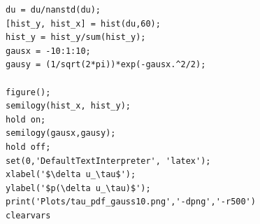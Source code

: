 \documentclass[10pt]{article}
\begin{document}
\begin{lstlisting}
du = du/nanstd(du);
[hist_y, hist_x] = hist(du,60);
hist_y = hist_y/sum(hist_y);
gausx = -10:1:10;
gausy = (1/sqrt(2*pi))*exp(-gausx.^2/2);

figure();
semilogy(hist_x, hist_y);
hold on;
semilogy(gausx,gausy);
hold off;
set(0,'DefaultTextInterpreter', 'latex');
xlabel('$\delta u_\tau$');
ylabel('$p(\delta u_\tau)$');
print('Plots/tau_pdf_gauss10.png','-dpng','-r500')
clearvars
\end{lstlisting}
\end{document}
